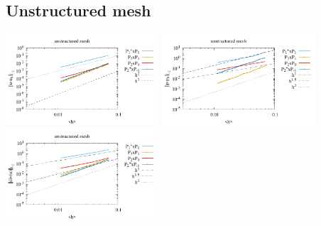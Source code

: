 \subsection*{Unstructured mesh}

\begin{center}
\includegraphics[width=5.7cm]{python_codes/fieldstone_120/paperresults/tesk12_unstructured_errorsV.pdf}
\includegraphics[width=5.7cm]{python_codes/fieldstone_120/paperresults/tesk12_unstructured_errorsP.pdf}
\includegraphics[width=5.7cm]{python_codes/fieldstone_120/paperresults/tesk12_unstructured_errors_divv.pdf}\\
\end{center}

